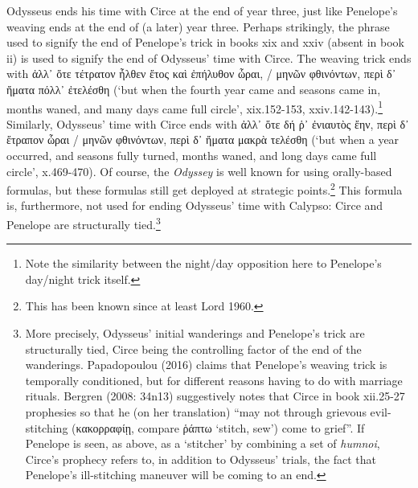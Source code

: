 \documentclass[12pt]{article}
\begin{document}
Odysseus ends his time with Circe at the end of year three, just like Penelope's weaving ends at the end of (a later) year three. Perhaps strikingly, the phrase used to signify the end of Penelope's trick in books xix and xxiv (absent in book ii) is used to signify the end of Odysseus' time with Circe. The weaving trick ends with ἀλλ᾿ ὅτε τέτρατον ἦλθεν ἔτος καὶ ἐπήλυθον ὧραι, / μηνῶν φθινόντων, περὶ δ᾿ ἤματα πόλλ᾿ ἐτελέσθη (`but when the fourth year came and seasons came in, months waned, and many days came full circle', xix.152-153, xxiv.142-143).\footnote{ Note the similarity between the night/day opposition here to Penelope's day/night trick itself.} Similarly, Odysseus' time with Circe ends with ἀλλ᾿ ὅτε δή ῥ᾿ ἐνιαυτὸς ἔην, περὶ δ᾿ ἔτραπον ὧραι / μηνῶν φθινόντων, περὶ δ᾿ ἤματα μακρὰ τελέσθη (`but when a year occurred, and seasons fully turned, months waned, and long days came full circle', x.469-470). Of course, the \textit{Odyssey} is well known for using orally-based formulas, but these formulas still get deployed at strategic points.\footnote{ This has been known since at least Lord 1960.} This formula is, furthermore, not used for ending Odysseus' time with Calypso: Circe and Penelope are structurally tied.\footnote{ More precisely, Odysseus' initial wanderings and Penelope's trick are structurally tied, Circe being the controlling factor of the end of the wanderings. Papadopoulou (2016) claims that Penelope's weaving trick is temporally conditioned, but for different reasons having to do with marriage rituals. Bergren (2008: 34n13) suggestively notes that Circe in book xii.25-27 prophesies so that he (on her translation) ``may not through grievous evil-stitching (κακορραφίῃ, compare ῥάπτω `stitch, sew') come to grief''. If Penelope is seen, as above, as a `stitcher' by combining a set of \textit{humnoi}, Circe's prophecy refers to, in addition to Odysseus' trials, the fact that Penelope's ill-stitching maneuver will be coming to an end.}
\end{document}
